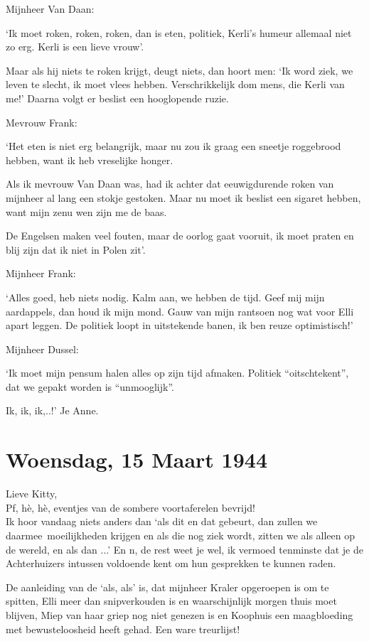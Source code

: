 \documentclass{book}
\begin{document}
Mijnheer Van Daan:

`Ik moet roken, roken, roken, dan is eten, politiek, Kerli's humeur allemaal
niet zo erg. Kerli is een lieve vrouw'.

Maar als hij niets te roken krijgt, deugt niets, dan hoort men: `Ik word ziek,
we leven te slecht, ik moet vlees hebben. Verschrikkelijk dom mens, die Kerli
van me!' Daarna volgt er beslist een hooglopende ruzie.

Mevrouw Frank:

`Het eten is niet erg belangrijk, maar nu zou ik graag een sneetje roggebrood
hebben, want ik heb vreselijke honger.

Als ik mevrouw Van Daan was, had ik achter dat eeuwigdurende roken van mijnheer
al lang een stokje gestoken. Maar nu moet ik beslist een sigaret hebben, want
mijn zenu wen zijn me de baas.

De Engelsen maken veel fouten, maar de oorlog gaat vooruit, ik moet praten en
blij zijn dat ik niet in Polen zit'.

Mijnheer Frank:

`Alles goed, heb niets nodig. Kalm aan, we hebben de tijd. Geef mij mijn
aardappels, dan houd ik mijn mond. Gauw van mijn rantsoen nog wat voor Elli
apart leggen. De politiek loopt in uitstekende banen, ik ben reuze
optimistisch!'

Mijnheer Dussel:

`Ik moet mijn pensum halen alles op zijn tijd afmaken. Politiek
``oitschtekent'', dat we gepakt worden is ``unmooglijk''.

Ik, ik, ik,..!' Je Anne.

\section*{Woensdag, 15 Maart 1944}

Lieve Kitty,\\
Pf, hè, hè, eventjes van de sombere voortaferelen bevrijd!\\
Ik
hoor vandaag niets anders dan `als dit en dat gebeurt, dan zullen we
daarmee~moeilijkheden krijgen en als die nog ziek wordt, zitten we als alleen op
de wereld, en als dan ...' En n, de rest weet je wel, ik vermoed tenminste dat
je de Achterhuizers intussen voldoende kent om hun gesprekken te kunnen raden.

De aanleiding van de `als, als' is, dat mijnheer Kraler opgeroepen is om te
spitten, Elli meer dan snipverkouden is en waarschijnlijk morgen thuis moet
blijven, Miep van haar griep nog niet genezen is en Koophuis een maagbloeding
met bewusteloosheid heeft gehad. Een ware treurlijst!
\end{document}
